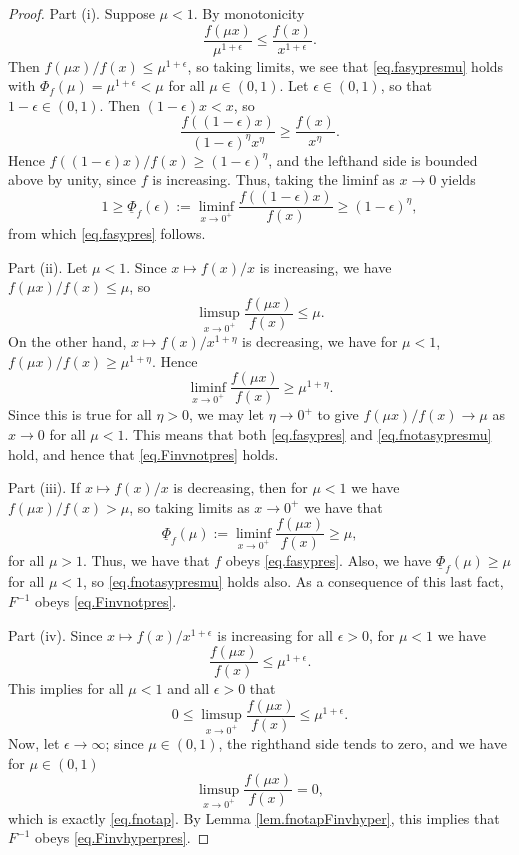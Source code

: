\documentclass[a4paper,10pt,reqno]{amsart}
\numberwithin{equation}{section}
\theoremstyle{definition}
\theoremstyle{remark}
\DeclareMathOperator{\1}{\mathbbm 1}
\begin{document}
	\begin{proof}
		Part (i). Suppose $\mu<1$. By monotonicity 
		\[
		\frac{f(\mu x)}{\mu^{1+\epsilon}}\leq \frac{f(x)}{x^{1+\epsilon}}.
		\]
		Then $f(\mu x)/f(x) \leq \mu^{1+\epsilon}$, so taking limits, we see that \eqref{eq.fasypresmu} holds with $\Phi_f(\mu)=\mu^{1+\epsilon}<\mu$ for all $\mu\in (0,1)$. 
		Let $\epsilon\in (0,1)$, so that $1-\epsilon\in (0,1)$. Then $(1-\epsilon)x<x$, so 
		\[
		\frac{f((1-\epsilon)x)}{(1-\epsilon)^\eta x^\eta}\geq \frac{f(x)}{x^\eta}.
		\]
		Hence $f((1-\epsilon)x)/f(x) \geq  (1-\epsilon)^\eta$, 
		and the lefthand side is bounded above by unity, since $f$ is increasing. Thus, taking the liminf as $x\to 0$ yields 
		\[
		1\geq \underline{\Phi}_f(\epsilon):=\liminf_{x\to 0^+} \frac{f((1-\epsilon)x)}{f(x)} \geq  (1-\epsilon)^\eta,
		\]
		from which \eqref{eq.fasypres} follows. 
		
		Part (ii). Let $\mu<1$. Since $x\mapsto f(x)/x$ is increasing, we have $f(\mu x)/f(x)\leq \mu$, so 
		\[
		\limsup_{x\to 0^+} \frac{f(\mu x)}{f(x)}\leq \mu.
		\] 
		On the other hand, $x\mapsto f(x)/x^{1+\eta}$ is decreasing, we have for $\mu <1$, $f(\mu x)/f(x)\geq \mu^{1+\eta}$. Hence 
		\[
		\liminf_{x\to 0^+} \frac{f(\mu x)}{f(x)}\geq \mu^{1+\eta}.
		\] 
		Since this is true for all $\eta>0$, we may let $\eta\to 0^+$ to give 
		$f(\mu x)/f(x)\to \mu$ as $x\to 0$ for all $\mu<1$. This means that both \eqref{eq.fasypres} and \eqref{eq.fnotasypresmu} hold, and hence that \eqref{eq.Finvnotpres} holds. 
		
		Part (iii). If $x\mapsto f(x)/x$ is decreasing, then for $\mu<1$ we have $f(\mu x)/f(x)>\mu$, so taking limits as $x\to 0^+$ we have that 
		\[
		\underline{\Phi}_f(\mu):=\liminf_{x\to 0^+} \frac{f(\mu x)}{f(x)}\geq \mu,
		\]
		for all $\mu>1$. Thus, we have that $f$ obeys \eqref{eq.fasypres}. 
		Also, we have $\underline{\Phi}_f(\mu)\geq \mu$ for all $\mu<1$, so \eqref{eq.fnotasypresmu} holds also. As a consequence of this last fact, $F^{-1}$ obeys \eqref{eq.Finvnotpres}.
		
		Part (iv). Since $x\mapsto f(x)/x^{1+\epsilon}$ is increasing for all $\epsilon>0$, for $\mu<1$ we have 
		\[
		\frac{f(\mu x)}{f(x)}\leq \mu^{1+\epsilon}.
		\]
		This implies for all $\mu<1$ and all $\epsilon>0$ that 
		\[
		0\leq \limsup_{x\to 0^+} \frac{f(\mu x)}{f(x)}\leq \mu^{1+\epsilon}.
		\]
		Now, let $\epsilon\to \infty$; since $\mu\in (0,1)$, the righthand side tends to zero, and we have for $\mu\in (0,1)$
		\[
		\limsup_{x\to 0^+} \frac{f(\mu x)}{f(x)}=0,
		\]
		which is exactly \eqref{eq.fnotap}. By Lemma \ref{lem.fnotapFinvhyper}, this implies that $F^{-1}$ obeys \eqref{eq.Finvhyperpres}.
	\end{proof}
	
\end{document}
